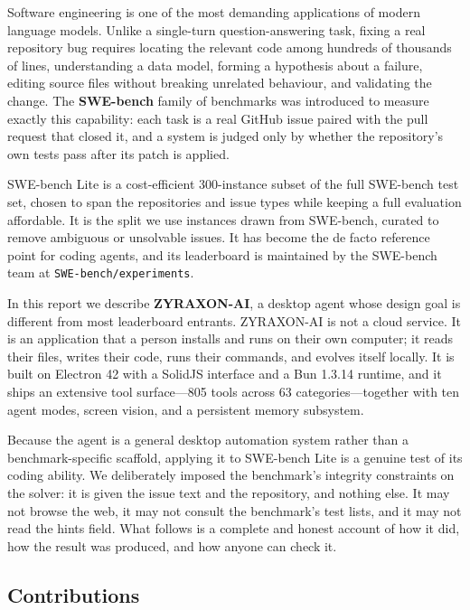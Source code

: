 \documentclass[11pt,a4paper]{article}
\begin{document}
Software engineering is one of the most demanding applications of modern language
models. Unlike a single-turn question-answering task, fixing a real repository bug
requires locating the relevant code among hundreds of thousands of lines, understanding
a data model, forming a hypothesis about a failure, editing source files without
breaking unrelated behaviour, and validating the change. The \textbf{SWE-bench} family
of benchmarks \cite{jimenez2024swebench} was introduced to measure exactly this
capability: each task is a real GitHub issue paired with the pull request that closed
it, and a system is judged only by whether the repository's own tests pass after its
patch is applied.

SWE-bench Lite \cite{jimenez2024swebench} is a cost-efficient 300-instance subset of the
full SWE-bench test set, chosen to span the repositories and issue types while keeping a
full evaluation affordable. It is the split we use
instances drawn from SWE-bench, curated to remove ambiguous or unsolvable issues. It has
become the de facto reference point for coding agents, and its leaderboard is
maintained by the SWE-bench team at \texttt{SWE-bench/experiments}.

In this report we describe \textbf{ZYRAXON-AI}, a desktop agent whose design goal is
different from most leaderboard entrants. ZYRAXON-AI is not a cloud service. It is an
application that a person installs and runs on their own computer; it reads their files,
writes their code, runs their commands, and evolves itself locally. It is built on
Electron 42 with a SolidJS interface and a Bun 1.3.14 runtime, and it ships an extensive
tool surface---805 tools across 63 categories---together with ten agent modes, screen
vision, and a persistent memory subsystem.

Because the agent is a general desktop automation system rather than a benchmark-specific
scaffold, applying it to SWE-bench Lite is a genuine test of its coding ability. We
deliberately imposed the benchmark's integrity constraints on the solver: it is given the
issue text and the repository, and nothing else. It may not browse the web, it may not
consult the benchmark's test lists, and it may not read the hints field. What follows is
a complete and honest account of how it did, how the result was produced, and how anyone
can check it.

\subsection{Contributions}
\end{document}
